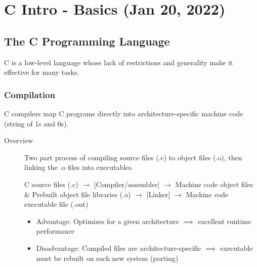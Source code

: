 \chapter{C Intro - Basics (Jan 20, 2022)}

\section{The C Programming Language}
C is a low-level language whose lack of restrictions and generality make it effective for many tasks.

\subsection{Compilation}
C compilers map C programs directly into architecture-specific machine code (string of 1s and 0s).

\begin{description}
    \item[Overview] Two part process of compiling source files (.c) to object files (.o), then linking the .o files into executables.

    C source files (.c) \(\rightarrow\) [Compiler/assembler] \(\rightarrow\) Machine code object files \& Prebuilt object file libraries (.o) \(\rightarrow\) [Linker] \(\rightarrow\) Machine code executable file (.out)
    
    \begin{itemize}
        \item Advantage: Optimizes for a given architecture \(\implies\) excellent runtime performance
        \item Disadvantage: Compiled files are architecture-specific \(\implies\) executable must be rebuilt on each new system (porting)
    \end{itemize}
\end{description}


